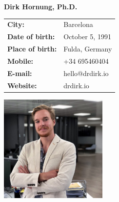 \documentclass[11pt]{article}
\begin{document}
\Large
\noindent
\textbf{Dirk Hornung, Ph.D.} \\

\normalsize
\noindent
\begin{minipage}{0.5\linewidth}
  \begin{tabularx}{0.6\textwidth}{>{\bfseries}l l}
    City:           & Barcelona \\
    Date of birth:  & October 5, 1991\\
    Place of birth: & Fulda, Germany \\
    Mobile:         & +34 695460404 \\
    E-mail:         & hello@drdirk.io \\
    Website:      	& drdirk.io
  \end{tabularx}
\end{minipage}
\begin{minipage}{0.5\linewidth}
  \begin{flushright}
    \includegraphics[width=0.4\textwidth]{dirk.png}
  \end{flushright}
\end{minipage}

 \section*{}
 \vspace{1cm}


\end{document}
